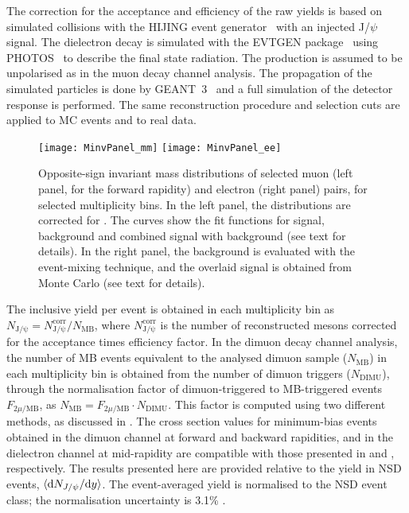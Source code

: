 The correction for the acceptance and efficiency of the raw yields is based on simulated \ppb collisions with the HIJING event generator~\cite{Wang:1991hta} with an injected J/$\psi$ signal.  The dielectron decay is simulated with the EVTGEN package~\cite{Lange:2001uf} using PHOTOS~\cite{BARBERIO1991115,BARBERIO1994291} to describe the final state radiation. The production is assumed to be unpolarised as in the muon decay channel analysis. The propagation of the simulated particles is done by GEANT~3~\cite{GEANT3} and a full simulation of the detector response is performed. The same reconstruction procedure and selection cuts are applied to MC events and to real data.

 \begin{figure}[htb]
  {\centering 
\texttt{[image: MinvPanel\_mm]}
\texttt{[image: MinvPanel\_ee]}
\par}
\caption{\label{fig:minv}  Opposite-sign invariant mass distributions of selected muon (left panel, for the forward rapidity) and electron (right panel) pairs, for selected multiplicity bins. In the left panel, the distributions are corrected for \acef. The curves show the fit functions for signal, background and combined signal with background (see text for details). In the right panel, the background is evaluated with the event-mixing technique, and the overlaid signal is obtained from Monte Carlo (see text for details).}
\end{figure}

The inclusive \jpsi yield per event is obtained in each multiplicity bin as
$N_{\mathrm{J/\psi}} = {N_{\mathrm{J/\psi}}^{\mathrm{corr}}}/{N_{\mathrm{MB}}}$,
where $N_{\mathrm{J/\psi}}^{\mathrm{corr}}$ is the number of reconstructed \jpsi mesons corrected for the acceptance times efficiency factor. In the dimuon decay channel analysis, the number of MB events equivalent to the analysed dimuon sample ($N_{\mathrm{MB}}$) in each multiplicity bin is obtained from the number of dimuon triggers ($N_{\mathrm{DIMU}}$), through the normalisation factor of dimuon-triggered to MB-triggered events $F_{2\mu / \mathrm{MB}}$, as $N_{\mathrm{MB}} = F_{2\mu / \mathrm{MB}} \cdot N_{\mathrm{DIMU}}$. This factor is computed using two different methods, as discussed in \cite{Adam:2015jsa}. The \jpsi %
cross section values for minimum-bias events obtained in the dimuon channel at forward and backward rapidities, and in the dielectron channel at mid-rapidity are compatible with those presented in \cite{Abelev:2014aa} and \cite{Adam:2015ac}, respectively.
The results presented here are provided relative to the yield in NSD events, $\langle {\rm d}N_{J/\psi}/{\rm d}y\rangle$.
The event-averaged yield is normalised to the NSD event class; the normalisation uncertainty is 3.1\% \cite{Abelev:2013ab}. 

